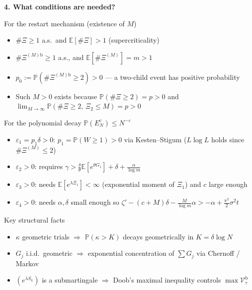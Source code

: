 
\small
\textbf{4. What conditions are needed?}

\begin{block}{For the restart mechanism (existence of $M$)}
    \begin{itemize}
        \item $\#\Xi\ge 1$ a.s.\ and $\mathbb{E}[\#\Xi]>1$ (supercriticality)
        \item $\#\Xi^{(M)\mathrm b}\ge 1$ a.s., and $\mathbb{E}[\#\Xi^{(M)}]=m>1$
        \item $p_0:=\mathbb{P}(\#\Xi^{(M)\mathrm b}\ge 2)>0$ — a two-child event has positive probability
        \item Such $M>0$ exists because $\mathbb{P}(\#\Xi\ge 2)=p>0$ and $\lim_{M\to\infty}\mathbb{P}(\#\Xi\ge 2,\,\Xi_2\le M)=p>0$
    \end{itemize}
\end{block}

\vspace{-2mm}
\begin{block}{For the polynomial decay $\mathbb{P}(E_N^{\mathrm{c}})\le N^{-\varepsilon}$}
    \begin{itemize}
        \item $\varepsilon_1=p_1\delta>0$: $p_1=\mathbb{P}(W\ge 1)>0$ via Kesten--Stigum ($L\log L$ holds since $\#\Xi^{(M)}\le 2$)
        \item $\varepsilon_2>0$: requires $\gamma>\frac{\delta}{\theta}\mathbb{E}[e^{\theta G_1}]+\delta+\frac{\alpha}{\log m}$
        \item $\varepsilon_3>0$: needs $\mathbb{E}[e^{\lambda\Xi_1}]<\infty$ (exponential moment of $\Xi_1$) and $c$ large enough
        \item $\varepsilon_4>0$: needs $\alpha,\delta$ small enough so $\zeta'-(c+M)\delta-\frac{M}{\log m}\alpha>-\alpha+\frac{\pi^2}{2}\sigma^2 t$
    \end{itemize}
\end{block}

\vspace{-2mm}
\begin{block}{Key structural facts}
    \begin{itemize}
        \item $\kappa$ geometric trials $\Rightarrow$ $\mathbb{P}(\kappa>K)$ decays geometrically in $K=\delta\log N$
        \item $G_j$ i.i.d.\ geometric $\Rightarrow$ exponential concentration of $\sum G_j$ via Chernoff / Markov
        \item $(e^{\lambda S_k})$ is a submartingale $\Rightarrow$ Doob's maximal inequality controls $\max\mathcal{V}^{\mathrm{b}}_\tau$
    \end{itemize}
\end{block}
